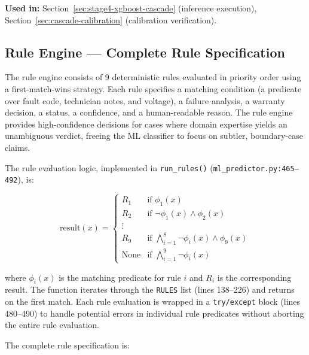 \documentclass[10pt,a4paper]{article}
\begin{document}
\textbf{Used in:} Section~\ref{sec:stage4-xgboost-cascade} (inference execution), Section~\ref{sec:cascade-calibration} (calibration verification).

\subsection{Rule Engine --- Complete Rule Specification}
\label{sec:rule-engine-specification}

The rule engine consists of 9 deterministic rules evaluated in priority order using a first-match-wins strategy. Each rule specifies a matching condition (a predicate over fault code, technician notes, and voltage), a failure analysis, a warranty decision, a status, a confidence, and a human-readable reason. The rule engine provides high-confidence decisions for cases where domain expertise yields an unambiguous verdict, freeing the ML classifier to focus on subtler, boundary-case claims.

The rule evaluation logic, implemented in \texttt{run\_rules()} (\texttt{ml\_predictor.py:465--492}), is:

\begin{equation}
\text{result}(x) = \begin{cases}
R_1     & \text{if } \phi_1(x) \\
R_2     & \text{if } \neg\phi_1(x) \land \phi_2(x) \\
\vdots  & \\
R_9     & \text{if } \bigwedge_{i=1}^{8} \neg\phi_i(x) \land \phi_9(x) \\
\text{None} & \text{if } \bigwedge_{i=1}^{9} \neg\phi_i(x)
\end{cases}
\label{eq:rule-eval}
\end{equation}

where $\phi_i(x)$ is the matching predicate for rule $i$ and $R_i$ is the corresponding result. The function iterates through the \texttt{RULES} list (lines 138--226) and returns on the first match. Each rule evaluation is wrapped in a \texttt{try/except} block (lines 480--490) to handle potential errors in individual rule predicates without aborting the entire rule evaluation.

The complete rule specification is:
\end{document}
